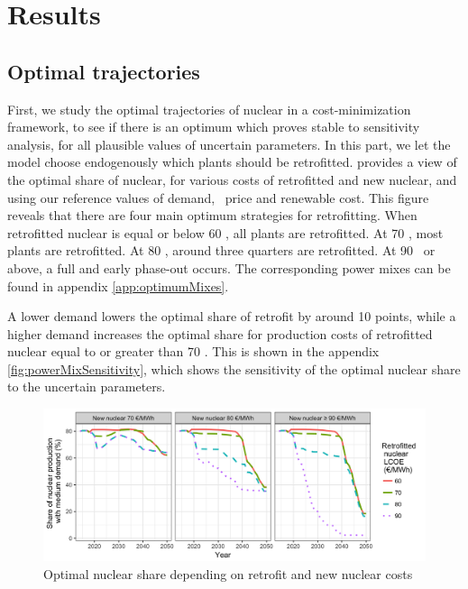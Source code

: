 





\section{Results}
\label{sec:results}

\subsection{Optimal trajectories}
\label{ssec:optimaltraj}
First, we study the optimal trajectories of nuclear in a cost-minimization framework, to see if there is an optimum which proves stable to sensitivity analysis, for all plausible values of uncertain parameters. In this part, we let the model choose endogenously which plants should be retrofitted.
 provides a view of the optimal share of nuclear, for various costs of retrofitted and new nuclear, and using our reference values of demand, \coo\ price and renewable cost. This figure reveals that there are four main optimum strategies for retrofitting. When retrofitted nuclear is equal or below 60 \emwh, all plants are retrofitted. At 70 \emwh, most plants are retrofitted. At 80 \emwh, around three quarters are retrofitted. At 90 \emwh\ or above, a full and early phase-out occurs. The corresponding power mixes can be found in appendix \ref{app:optimumMixes}.

A lower demand lowers the optimal share of retrofit by around 10 points, while a higher demand increases the optimal share for production costs of retrofitted nuclear equal to or greater than 70 \emwh. This is shown in the appendix \cref{fig:powerMixSensitivity}, which shows the sensitivity of the optimal nuclear share to the uncertain parameters. 

\begin{figure}[!ht]
	\centering
	\includegraphics[width=12cm]{figures/nukeShare2_MedD.png}
	\caption{Optimal nuclear share depending on retrofit and new nuclear costs}
	\label{fig:nukeShare}
\end{figure}

